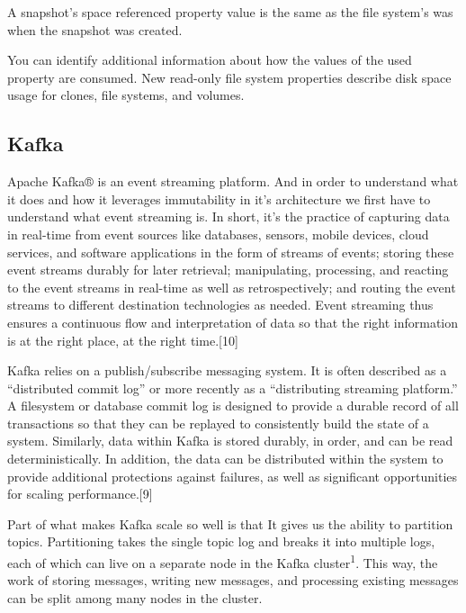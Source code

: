 \documentclass[12pt,twoside]{article}
\begin{document}
A snapshot's space referenced property value is the same as the file system's was when the snapshot was created.

You can identify additional information about how the values of the used property are consumed. New read-only file system properties describe disk space usage for clones, file systems, and volumes.


\subsection{Kafka}
Apache Kafka® is an event streaming platform. And in order to understand what it does and how it leverages immutability in it's architecture we first have to understand what event streaming is. In short, it's the practice of capturing data in real-time from event sources like databases, sensors, mobile devices, cloud services, and software applications in the form of streams of events; storing these event streams durably for later retrieval; manipulating, processing, and reacting to the event streams in real-time as well as retrospectively; and routing the event streams to different destination technologies as needed. Event streaming thus ensures a continuous flow and interpretation of data so that the right information is at the right place, at the right time.[10]


Kafka relies on a publish/subscribe messaging system. It is often described as a “distributed commit log” or more recently as a “distributing streaming platform.” A filesystem or database commit log is designed to provide a durable record of all transactions so that they can be replayed to consistently build the state of a system. Similarly, data within Kafka is stored durably, in order, and can be read deterministically. In addition, the data can be distributed within the system to provide additional protections against failures, as well as significant opportunities for scaling performance.[9]

Part of what makes Kafka scale so well is that It gives us the ability to partition topics. Partitioning takes the single topic log and breaks it into multiple logs, each of which can live on a separate node in the Kafka cluster\textsuperscript{1}. This way, the work of storing messages, writing new messages, and processing existing messages can be split among many nodes in the cluster.
\end{document}
